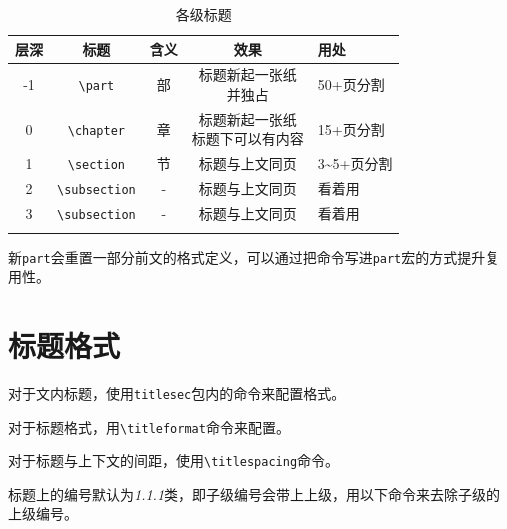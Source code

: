 \documentclass[10pt,openany]{book}
\begin{document}
\begin{sloppypar}
\begin{center}
    \begin{longtable}{ccccl}
        \textbf{层深} & \textbf{标题}                        & \textbf{含义} & \textbf{效果}       & \textbf{用处}           \\
        \hline
        \endfirsthead
        -1          & \texttt{\textbackslash part}       & 部           & \makecell{标题新起一张纸                         \\并独占} & 50+页分割  \\
        \hline
        0           & \texttt{\textbackslash chapter}    & 章           & \makecell{标题新起一张纸                         \\标题下可以有内容} & 15+页分割\\
        \hline
        1           & \texttt{\textbackslash section}    & 节           & 标题与上文同页           & 3\textasciitilde5+页分割 \\
        \hline
        2           & \texttt{\textbackslash subsection} & -           & 标题与上文同页           & 看着用                   \\
        \hline
        3           & \texttt{\textbackslash subsection} & -           & 标题与上文同页           & 看着用                   \\
        \hline
        \caption{各级标题}
    \end{longtable}
\end{center}

新\texttt{part}会重置一部分前文的格式定义，可以通过把命令写进\texttt{part}宏的方式提升复用性。



\section{标题格式}

对于文内标题，使用\texttt{titlesec}包内的命令来配置格式。

对于标题格式，用\texttt{\textbackslash{}titleformat}命令来配置。



对于标题与上下文的间距，使用\texttt{\textbackslash{}titlespacing}命令。



标题上的编号默认为\textit{1.1.1}类，即子级编号会带上上级，用以下命令来去除子级的上级编号。


\end{sloppypar}
\end{document}

